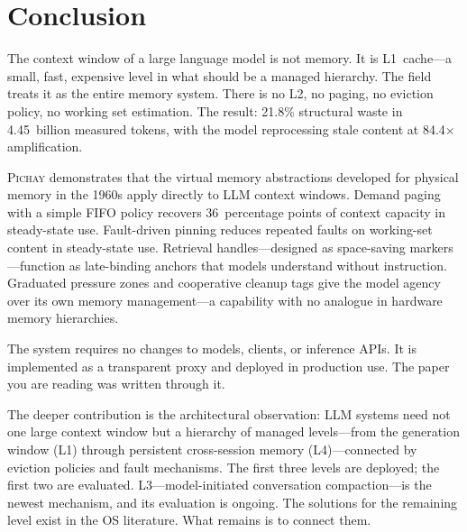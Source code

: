 \section{Conclusion}

The context window of a large language model is not memory. It is
L1~cache---a small, fast, expensive level in what should be a
managed hierarchy. The field treats it as the entire memory system.
There is no L2, no paging, no eviction policy, no working set
estimation. The result: 21.8\% structural waste in 4.45~billion
measured tokens, with the model reprocessing stale content at
84.4$\times$ amplification.

\textsc{Pichay} demonstrates that the virtual memory abstractions
developed for physical memory in the 1960s apply directly to LLM
context windows. Demand paging with a simple FIFO policy recovers
36~percentage points of context capacity in steady-state use.
Fault-driven pinning reduces repeated faults on working-set content in
steady-state use.
Retrieval handles---designed as space-saving markers---function as
late-binding anchors that models understand without instruction.
Graduated pressure zones and cooperative cleanup tags give the model
agency over its own memory management---a capability with no analogue
in hardware memory hierarchies.

The system requires no changes to models, clients, or inference
APIs. It is implemented as a transparent proxy and deployed in
production use. The paper you are reading was written through it.

The deeper contribution is the architectural observation: LLM
systems need not one large context window but a hierarchy of
managed levels---from the generation window (L1) through persistent
cross-session memory (L4)---connected by eviction policies and
fault mechanisms. The first three levels are deployed; the first
two are evaluated. L3---model-initiated conversation compaction---is
the newest mechanism, and its evaluation is ongoing. The solutions
for the remaining level exist in the OS literature.
What remains is to connect them.

